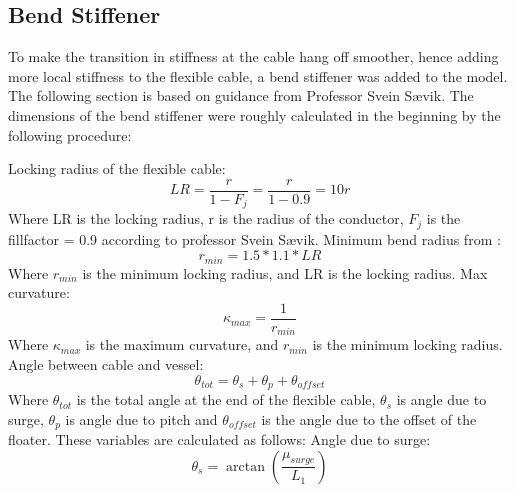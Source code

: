 \subsection{Bend Stiffener}
To make the transition in stiffness at the cable hang off smoother, hence adding more local stiffness to the flexible cable, a bend stiffener was added to the model. The following section is based on guidance from Professor Svein Sævik. 
\newline 
\newline
The dimensions of the bend stiffener were roughly calculated in the beginning by the following procedure: \newline
\newline

\noindent Locking radius of the flexible cable:
\begin{equation}
    LR = \frac{r}{1-F_j} = \frac{r}{1-0.9} = 10r
\end{equation}
Where LR is the locking radius, r is the radius of the conductor, $F_j$ is the fillfactor = 0.9 according to professor Svein Sævik. \newline
\newline
Minimum bend radius from \cite{API2014}:
\begin{equation}
   r_{min}= 1.5 * 1.1 * LR
\end{equation}
Where $r_{min}$ is the minimum locking radius, and LR is the locking radius. 
\newline
\newline
Max curvature:
\begin{equation}
   \kappa_{max}= \frac{1}{r_{min}}
\end{equation}
Where $\kappa_{max}$ is the maximum curvature, and  $r_{min}$ is the minimum locking radius.
\newline
\newline
Angle between cable and vessel: 
\begin{equation}
   \theta_{tot} = \theta_{s} + \theta_{p} +   \theta_{offset}
\end{equation}
Where $\theta_{tot}$ is the total angle at the end of the flexible cable, $\theta_{s}$ is angle due to surge, $\theta_{p}$ is angle due to pitch and $\theta_{offset}$ is the angle due to the offset of the floater. These variables are calculated as follows:\newline
\newline 
Angle due to surge:
\begin{equation}
   \theta_{s} = \arctan{(\frac{\mu_{surge}}{L_{1}})}
\end{equation}

